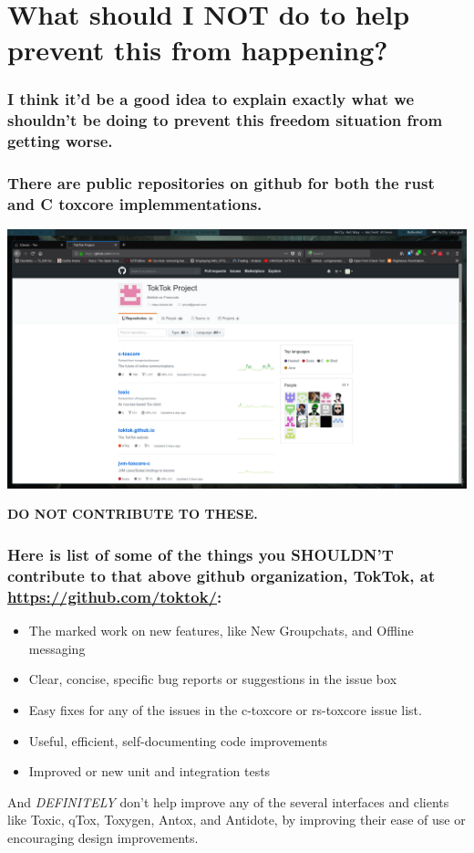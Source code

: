 \documentclass{beamer}
\begin{document}
  \section{What should I NOT do to help prevent this from happening?}
  \begin{frame}
      \frame{\sectionpage}
  \end{frame}
  \begin{frame}
      \frametitle{I think it'd be a good idea to explain exactly what we shouldn't be doing to prevent this freedom situation from getting worse.}
  \end{frame}
  \begin{frame}
      \frametitle{There are public repositories on github for both the rust and C toxcore implemmentations.}
      \includegraphics[width=\textwidth]{tox-github}

      {\bf DO NOT CONTRIBUTE TO THESE.}
  \end{frame}
  \begin{frame}
      \frametitle{Here is list of some of the things you SHOULDN'T contribute to that above github organization, TokTok, at \url{https://github.com/toktok/}:}
      \begin{itemize}
          \item The marked work on new features, like New Groupchats, and Offline messaging
          \item Clear, concise, specific bug reports or suggestions in the issue box
          \item Easy fixes for any of the issues in the c-toxcore or rs-toxcore issue list.
          \item Useful, efficient, self-documenting code improvements
          \item Improved or new unit and integration tests
      \end{itemize}
      And {\it DEFINITELY\/} don't help improve any of the several interfaces and clients like Toxic, qTox, Toxygen, Antox, and Antidote, by improving their ease of
      use or encouraging design improvements.
  \end{frame}
\end{document}
